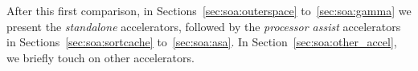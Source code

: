
After this first comparison, in Sections~\ref{sec:soa:outerspace} to~\ref{sec:soa:gamma} we present the \emph{standalone} accelerators, followed by the \emph{processor assist} accelerators in Sections~\ref{sec:soa:sortcache} to~\ref{sec:soa:asa}. In Section~\ref{sec:soa:other_accel}, we briefly touch on other accelerators.

